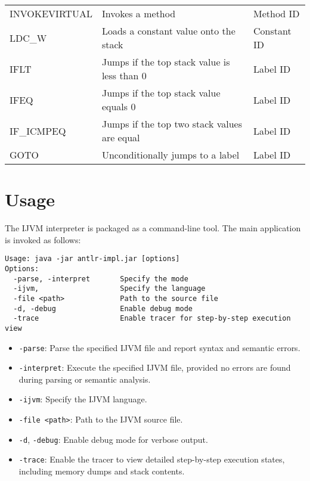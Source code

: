 \documentclass[11pt]{article}
\begin{document}
\begin{table}[H]
{\begin{tabular}{|l|l|l|}
INVOKEVIRTUAL & Invokes a method                                  					& Method ID \\
LDC\_W          	& Loads a constant value onto the stack             			& Constant ID \\
IFLT            		& Jumps if the top stack value is less than 0       			& Label ID \\
IFEQ            		& Jumps if the top stack value equals 0             				& Label ID \\
IF\_ICMPEQ      	& Jumps if the top two stack values are equal       			& Label ID \\
GOTO            		& Unconditionally jumps to a label                 				& Label ID \\
\hline
\end{tabular}
}
\end{table}

\section{Usage}
The IJVM interpreter is packaged as a command-line tool. The main application is invoked as follows:

\begin{verbatim}
Usage: java -jar antlr-impl.jar [options]
Options:
  -parse, -interpret       Specify the mode
  -ijvm,                   Specify the language
  -file <path>             Path to the source file
  -d, -debug               Enable debug mode
  -trace                   Enable tracer for step-by-step execution view
\end{verbatim}

\begin{itemize}
    \item \texttt{-parse}: Parse the specified IJVM file and report syntax and semantic errors.
    \item \texttt{-interpret}: Execute the specified IJVM file, provided no errors are found during parsing or semantic analysis.
    \item \texttt{-ijvm}: Specify the IJVM language.
    \item \texttt{-file <path>}: Path to the IJVM source file.
    \item \texttt{-d}, \texttt{-debug}: Enable debug mode for verbose output.
    \item \texttt{-trace}: Enable the tracer to view detailed step-by-step execution states, including memory dumps and stack contents.
\end{itemize}
\end{document}
